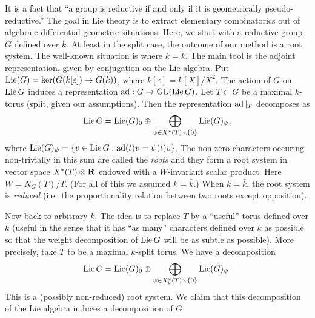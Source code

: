 \documentclass{article}
\begin{document}
It is a fact that ``a group is reductive if and only if it is geometrically 
pseudo-reductive.'' 
The goal in Lie theory is to extract elementary combinatorics out of 
algebraic differential geometric situations. Here, we start with a reductive 
group $G$ defined over $k$. At least in the split case, the outcome of our 
method is a root system. The well-known situation is where $k=\bar k$. 
The main tool is the adjoint representation, given by conjugation on the 
Lie algebra. Put 
$\operatorname{Lie}(G)=\ker(G(k[\varepsilon]) \to G(k))$, where $k[\varepsilon]=k[X]/X^2$. 
The action of $G$ on $\operatorname{Lie} G$ induces a representation 
$\operatorname{ad}:G\to \operatorname{GL}(\operatorname{Lie} G)$. Let $T\subset G$ be a maximal 
$k$-torus (split, given our assumptions). Then the representation 
$\operatorname{ad}|_T$ decomposes as 
\[
  \operatorname{Lie} G = \operatorname{Lie}(G)_0 \oplus \bigoplus_{\psi\in X^\ast(T)\smallsetminus \{0\}} \operatorname{Lie}(G)_\psi ,
\]
where $\operatorname{Lie}(G)_\psi= \{v\in \operatorname{Lie} G:\operatorname{ad}(t) v = \psi(t) v\}$. The non-zero 
characters occuring non-trivially in this sum are called the 
\emph{roots} and they form a root system in vector space 
$X^\ast(T)\otimes \mathbf{R}$ endowed with a $W$-invariant scalar product. Here 
$W=N_G(T)/T$. (For all of this we assumed $k=\bar k$.) When 
$k=\bar k$, the root system is \emph{reduced} (i.e.\ the 
proportionality relation between two roots except opposition). 

Now back to arbitrary $k$. The idea is to replace $T$ by a ``useful'' torus 
defined over $k$ (useful in the sense that it has ``as many'' characters 
defined over $k$ as possible so that the weight decomposition of 
$\operatorname{Lie} G$ will be as subtle as possible). More precisely, take $T$ to be a 
maximal $k$-split torus. We have a decomposition 
\[
  \operatorname{Lie} G=\operatorname{Lie}(G)_0 \oplus \bigoplus_{\psi\in X_k^\ast(T)\smallsetminus \{0\}} \operatorname{Lie}(G)_\psi.
\]
This is a (possibly non-reduced) root system. We claim that this decomposition 
of the Lie algebra induces a decomposition of $G$. 







\end{document}
